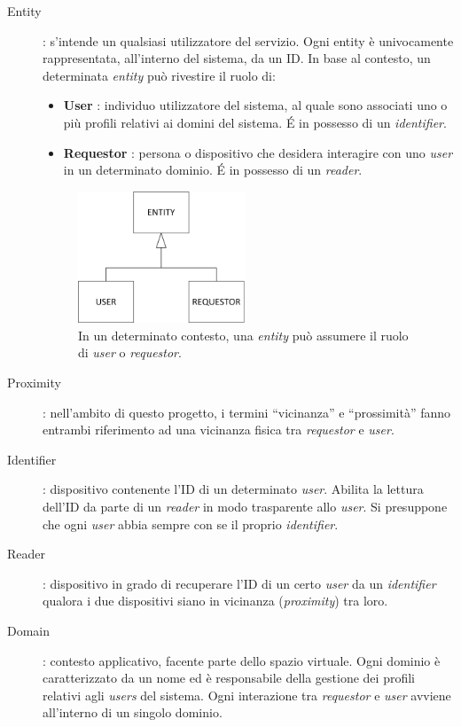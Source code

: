 \documentclass[a4paper,12pt]{report}
\begin{document}
\begin{description}
	\item[Entity] : s'intende un qualsiasi utilizzatore del servizio. Ogni entity è univocamente rappresentata, all'interno del sistema, da un ID. In base al contesto, un determinata \emph{entity} può rivestire il ruolo di: 
	\begin{itemize}
		\item \textbf{User} : individuo utilizzatore del sistema, al quale sono associati uno o più profili relativi ai domini del sistema. \'E in possesso di un \emph{identifier}. 
		\item \textbf{Requestor} : persona o dispositivo che desidera interagire con uno \emph{user} in un determinato dominio. \'E in possesso di un \emph{reader}.
	\end{itemize}
	\begin{figure}[H]
		\centering
		\includegraphics[width=50mm]{./img/entities.png}
		\caption{In un determinato contesto, una \emph{entity} può assumere il ruolo di \emph{user} o \emph{requestor}.\label{entity-img}}
	\end{figure}
	\item[Proximity]: nell'ambito di questo progetto, i termini ``vicinanza'' e ``prossimità'' fanno entrambi riferimento ad una vicinanza fisica tra \emph{requestor} e \emph{user}.
	\item[Identifier] : dispositivo contenente l'ID di un determinato \emph{user}. Abilita la lettura dell'ID da parte di un \emph{reader} in modo trasparente allo \emph{user}. Si presuppone che ogni \emph{user} abbia sempre con se il proprio \emph{identifier}. 
	\item[Reader] : dispositivo in grado di recuperare l'ID di un certo \emph{user} da un \emph{identifier} qualora i due dispositivi siano in vicinanza (\emph{proximity}) tra loro.
	\item[Domain] : contesto applicativo, facente parte dello spazio virtuale. Ogni dominio è caratterizzato da un nome ed è responsabile della gestione dei profili relativi agli \emph{users} del sistema. Ogni interazione tra \emph{requestor} e \emph{user} avviene all'interno di un singolo dominio. 

\end{description}
\end{document}
